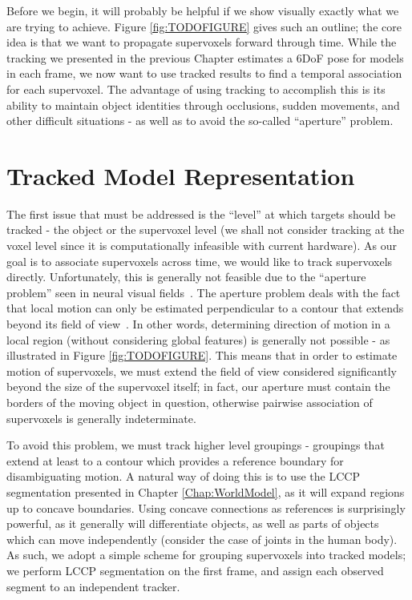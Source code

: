 Before we begin, it will probably be helpful if we show visually exactly what we are trying to achieve. Figure \ref{fig:TODOFIGURE} gives such an outline; the core idea is that we want to propagate supervoxels forward through time.  While the tracking we presented in the previous Chapter estimates a 6DoF pose for models in each frame, we now want to use tracked results to find a temporal association for each supervoxel. The advantage of using tracking to accomplish this is its ability to maintain object identities through occlusions, sudden movements, and other difficult situations - as well as to avoid the so-called ``aperture'' problem. 


\section{Tracked Model Representation}
The first issue that must be addressed is the ``level'' at which targets should be tracked - the object or the supervoxel level (we shall not consider tracking at the voxel level since it is computationally infeasible with current hardware). As our goal is to associate supervoxels across time, we would like to track supervoxels directly. Unfortunately, this is generally not feasible due to the ``aperture problem'' seen in neural visual fields~\cite{MarrApertureProblem}. The aperture problem deals with the fact that local motion can only be estimated perpendicular to a contour that extends beyond its field of view~\cite{shimojo1989}. In other words, determining direction of motion in a local region (without considering global features) is generally not possible - as illustrated in Figure \ref{fig:TODOFIGURE}. This means that in order to estimate motion of supervoxels, we must extend the field of view considered significantly beyond the size of the supervoxel itself; in fact, our aperture must contain the borders of the moving object in question, otherwise pairwise association of supervoxels is generally indeterminate. 


To avoid this problem, we must track higher level groupings - groupings that extend at least to a contour which provides a reference boundary for disambiguating motion. A natural way of doing this is to use the LCCP segmentation presented in Chapter \ref{Chap:WorldModel}, as it will expand regions up to concave boundaries. Using concave connections as references is surprisingly powerful, as it generally will differentiate objects, as well as parts of objects which can move independently (consider the case of joints in the human body). As such, we adopt a simple scheme for grouping supervoxels into tracked models; we perform LCCP segmentation on the first frame, and assign each observed segment to an independent tracker.

